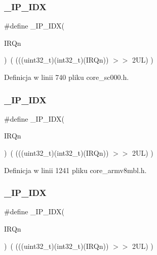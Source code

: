 \subsubsection{\texorpdfstring{\+\_\+\+I\+P\+\_\+\+I\+DX}{\_IP\_IDX}\hspace{0.1cm}{\footnotesize\ttfamily [4/6]}}
{\footnotesize\ttfamily \#define \+\_\+\+I\+P\+\_\+\+I\+DX(\begin{DoxyParamCaption}\item[{}]{I\+R\+Qn }\end{DoxyParamCaption})~(   (((uint32\+\_\+t)(int32\+\_\+t)(I\+R\+Qn))                $>$$>$    2\+U\+L)      )}



Definicja w linii 740 pliku core\+\_\+sc000.\+h.

\mbox{\label{group___c_m_s_i_s___core___n_v_i_c_functions_ga370ec4b1751a6a889d849747df3763a9}} 
\subsubsection{\texorpdfstring{\+\_\+\+I\+P\+\_\+\+I\+DX}{\_IP\_IDX}\hspace{0.1cm}{\footnotesize\ttfamily [5/6]}}
{\footnotesize\ttfamily \#define \+\_\+\+I\+P\+\_\+\+I\+DX(\begin{DoxyParamCaption}\item[{}]{I\+R\+Qn }\end{DoxyParamCaption})~(   (((uint32\+\_\+t)(int32\+\_\+t)(I\+R\+Qn))                $>$$>$    2\+U\+L)      )}



Definicja w linii 1241 pliku core\+\_\+armv8mbl.\+h.

\mbox{\label{group___c_m_s_i_s___core___n_v_i_c_functions_ga370ec4b1751a6a889d849747df3763a9}} 
\subsubsection{\texorpdfstring{\+\_\+\+I\+P\+\_\+\+I\+DX}{\_IP\_IDX}\hspace{0.1cm}{\footnotesize\ttfamily [6/6]}}
{\footnotesize\ttfamily \#define \+\_\+\+I\+P\+\_\+\+I\+DX(\begin{DoxyParamCaption}\item[{}]{I\+R\+Qn }\end{DoxyParamCaption})~(   (((uint32\+\_\+t)(int32\+\_\+t)(I\+R\+Qn))                $>$$>$    2\+U\+L)      )}



